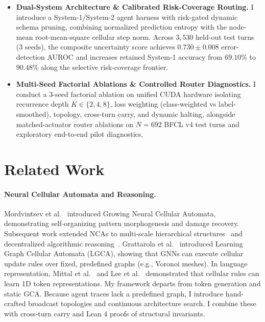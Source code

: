 \documentclass[10pt,twocolumn,letterpaper]{article}
\begin{document}
\begin{itemize}[leftmargin=1.5em, itemsep=0.1em]
  \item \textbf{Dual-System Architecture \& Calibrated Risk-Coverage Routing.} I introduce a System-1/System-2 agent harness with risk-gated dynamic schema pruning, combining normalized prediction entropy with the node-mean root-mean-square cellular step norm. Across $3{,}530$ held-out test turns (3 seeds), the composite uncertainty score achieves $0.730 \pm 0.008$ error-detection AUROC and increases retained System-1 accuracy from $69.10\%$ to $90.48\%$ along the selective risk-coverage frontier.
  \item \textbf{Multi-Seed Factorial Ablations \& Controlled Router Diagnostics.} I conduct a 3-seed factorial ablation on unified CUDA hardware isolating recurrence depth $K \in \{2, 4, 8\}$, loss weighting (class-weighted vs label-smoothed), topology, cross-turn carry, and dynamic halting, alongside matched-actuator router ablations on $N=692$ BFCL v4 test turns and exploratory end-to-end pilot diagnostics.
\end{itemize}

\section{Related Work}

\paragraph{Neural Cellular Automata and Reasoning.}
Mordvintsev et al.~\cite{mordvintsev2020growing} introduced Growing Neural Cellular Automata, demonstrating self-organizing pattern morphogenesis and damage recovery. Subsequent work extended NCAs to multi-scale hierarchical structures~\cite{pande2023hierarchical} and decentralized algorithmic reasoning~\cite{etcheverry2026reasoning}. Grattarola et al.~\cite{grattarola2021learning} introduced Learning Graph Cellular Automata (LGCA), showing that GNNs can execute cellular update rules over fixed, predefined graphs (e.g., Voronoi meshes). In language representation, Mittal et al.~\cite{mittal2026textnca} and Lee et al.~\cite{lee2026training} demonstrated that cellular rules can learn 1D token representations. My framework departs from token generation and static GCA. Because agent traces lack a predefined graph, I introduce hand-crafted broadcast topologies and continuous architecture search. I combine these with cross-turn carry and Lean 4 proofs of structural invariants.
\end{document}
